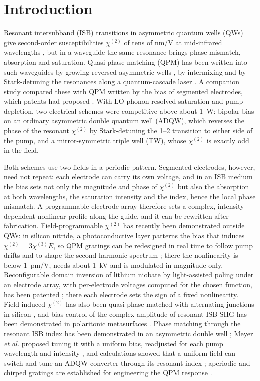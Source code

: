 \documentclass[11pt]{article}
\newcommand{\chitwo}{\chi^{(2)}}
\begin{document}
\section{Introduction}
Resonant intersubband (ISB) transitions in asymmetric quantum wells (QWs) give second-order susceptibilities $\chitwo$ of tens of nm/V at mid-infrared wavelengths \cite{Rosencher1996,Vurgaftman2021}, but in a waveguide the same resonance brings phase mismatch, absorption and saturation. Quasi-phase matching (QPM) has been written into such waveguides by growing reversed asymmetric wells \cite{Janz1994,Fiore1997}, by intermixing \cite{Bouchard2000,Zeaiter2003} and by Stark-detuning the resonances along a quantum-cascade laser \cite{Belkin2006}. A companion study \cite{OwnbyN1} compared these with QPM written by the bias of segmented electrodes, which patents had proposed \cite{Patent4880297,Patent5289309}. With LO-phonon-resolved saturation and pump depletion, two electrical schemes were competitive above about 1~W: bipolar bias on an ordinary asymmetric double quantum well (ADQW), which reverses the phase of the resonant $\chitwo$ by Stark-detuning the 1--2 transition to either side of the pump, and a mirror-symmetric triple well (TW), whose $\chitwo$ is exactly odd in the field.

Both schemes use two fields in a periodic pattern. Segmented electrodes, however, need not repeat: each electrode can carry its own voltage, and in an ISB medium the bias sets not only the magnitude and phase of $\chitwo$ but also the absorption at both wavelengths, the saturation intensity and the index, hence the local phase mismatch. A programmable electrode array therefore sets a complex, intensity-dependent nonlinear profile along the guide, and it can be rewritten after fabrication. Field-programmable $\chitwo$ has recently been demonstrated outside QWs: in silicon nitride, a photoconductive layer patterns the bias that induces $\chitwo=3\chi^{(3)}E$, so QPM gratings can be redesigned in real time to follow pump drifts and to shape the second-harmonic spectrum \cite{Yanagimoto2026}; there the nonlinearity is below 1~pm/V, needs about 1~kV and is modulated in magnitude only. Reconfigurable domain inversion of lithium niobate by light-assisted poling under an electrode array, with per-electrode voltages computed for the chosen function, has been patented \cite{PatentVanCamp}; there each electrode sets the sign of a fixed nonlinearity. Field-induced $\chitwo$ has also been quasi-phase-matched with alternating junctions in silicon \cite{Timurdogan2017}, and bias control of the complex amplitude of resonant ISB SHG has been demonstrated in polaritonic metasurfaces \cite{Yu2025}. Phase matching through the resonant ISB index has been demonstrated in an asymmetric double well \cite{Vodopyanov1998}; Meyer \emph{et al.} proposed tuning it with a uniform bias, readjusted for each pump wavelength and intensity \cite{Meyer1995APL}, and calculations showed that a uniform field can switch and tune an ADQW converter through its resonant index \cite{Vurgaftman1996SSC}; aperiodic and chirped gratings are established for engineering the QPM response \cite{Fejer1992,Arbore1997}.
\end{document}
